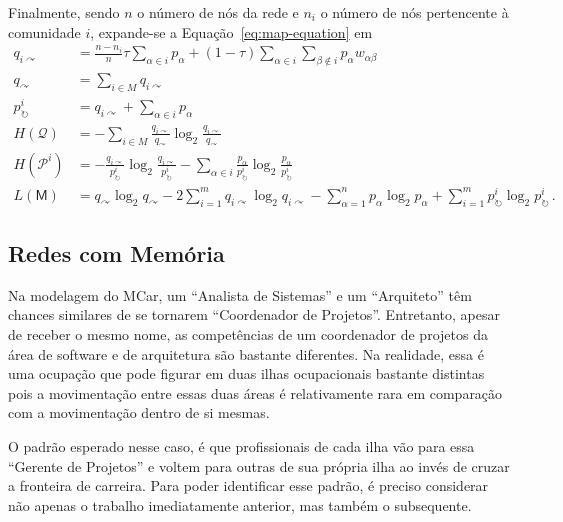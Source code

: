 \documentclass[
  article,
  11pt,
  a4paper,
  english,
  brazil,
  sumario=tradicional]{abntex2}
\begin{document}
Finalmente, sendo $n$ o número de nós da rede e $n_i$ o número de nós pertencente à comunidade $i$, expande-se a Equação~\ref{eq:map-equation} em
\begin{align}
q_{i \curvearrowright} &= \frac{n - n_i}{n} \tau \sum_{\alpha \in i} p_\alpha + (1 - \tau) \sum_{\alpha \in i} \sum_{\beta \nin i} p_\alpha w_{\alpha \beta} \nonumber \\
q_\curvearrowright       &= \sum_{i \in M} q_{i\curvearrowright} \nonumber \\
p^i_\circlearrowright    &= q_{i \curvearrowright} + \sum_{\alpha \in i} p_\alpha \nonumber \\
H(\mathcal{Q})            &= - \sum_{i \in M} \frac{q_{i \curvearrowright}}{q_\curvearrowright} \log_2 \frac{q_{i \curvearrowright}}{q_\curvearrowright} \nonumber \\
H(\mathcal{P}^i)         &= - \frac{q_{i \curvearrowright}}{p^i_\circlearrowright} \log_2 \frac{q_{i \curvearrowright}}{p^i_\circlearrowright} 
-  \sum_{\alpha \in i} \frac{p_\alpha}{p^i_\circlearrowright} \log_2  \frac{p_\alpha}{p^i_\circlearrowright} \label{eq:eta-p} \\
L(\mathsf{M})              &= q_\curvearrowright \log_2 q_\curvearrowright - 2 \sum_{i = 1}^m q_{i \curvearrowright} \log_2 q_{i \curvearrowright} - \sum_{\alpha = 1}^n p_\alpha \log_2 p_\alpha + \sum_{i = 1}^m p^i_\circlearrowright \log_2 p^i_\circlearrowright\,. \nonumber
\end{align}

\subsection{Redes com Memória}  \label{sec:redes-com-memoria}

Na modelagem do MCar, um \enquote{Analista de Sistemas} e um \enquote{Arquiteto} têm chances similares de se tornarem \enquote{Coordenador de Projetos}. Entretanto, apesar de receber o mesmo nome, as competências de um coordenador de projetos da área de software e de arquitetura são bastante diferentes. Na realidade, essa é uma ocupação que pode figurar em duas ilhas ocupacionais bastante distintas pois a movimentação entre essas duas áreas é relativamente rara em comparação com a movimentação dentro de si mesmas.

O padrão esperado nesse caso, é que profissionais de cada ilha vão para essa \enquote{Gerente de Projetos} e voltem para outras de sua própria ilha ao invés de cruzar a fronteira de carreira. Para poder identificar esse padrão, é preciso considerar não apenas o trabalho imediatamente anterior, mas também o subsequente.
\end{document}
